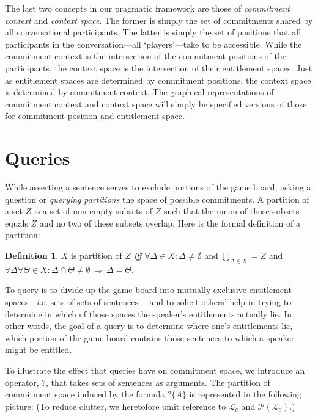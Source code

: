 \documentclass{article}                     %
\theoremstyle{definition}
\newtheorem{definition}{Definition}[section]
\begin{document}
The last two concepts in our pragmatic framework are those of \textit{commitment context} and \textit{context space}. The former is simply the set of commitments shared by all conversational participants. The latter is simply the set of positions that all participants in the conversation---all `players'---take to be accessible. While the commitment context is the intersection of the commitment positions of the participants, the context space is the intersection of their entitlement spaces. Just as entitlement spaces are determined by commitment positions, the context space is determined by commitment context. The graphical representations of commitment context and context space will simply be specified versions of those for commitment position and entitlement space.


\section{Queries}

While asserting a sentence serves to exclude portions of the game board, asking a question or \textit{querying} \textit{partitions} the space of possible commitments. A partition of a set $ Z $ is a set of non-empty subsets of $ Z $ such that the union of those subsets equals $ Z $ and no two of these subsets overlap. Here is the formal definition of a partition:

\begin{definition}
\item $ X $ is partition of $ Z $ \textit{iff} $ \forall\Delta \in X: \Delta \neq \emptyset$ and $ \bigcup\limits_{\Delta \in X}=  Z$ and $ \forall \Delta \forall \Theta \in X: \Delta \cap \Theta \neq \emptyset \,\Rightarrow\, \Delta = \Theta $.
\end{definition}

To query is to divide up the game board into mutually exclusive entitlement spaces---i.e. sets of sets of sentences--- and to solicit others' help in trying to determine in which of those spaces the speaker's entitlements actually lie. In other words, the goal of a query is to determine where one's entitlements lie, which portion of the game board contains those sentences to which a speaker might be entitled. 

To illustrate the effect that queries have on commitment space, we introduce an operator, ?, that takes sets of sentences as arguments. The partition of commitment space induced by the formula $ ?\{A\} $ is represented in the following picture: (To reduce clutter, we heretofore omit reference to $ \mathcal{L}_e $ and $\mathcal{P}(\mathcal{L}_e) $.)
\end{document}
